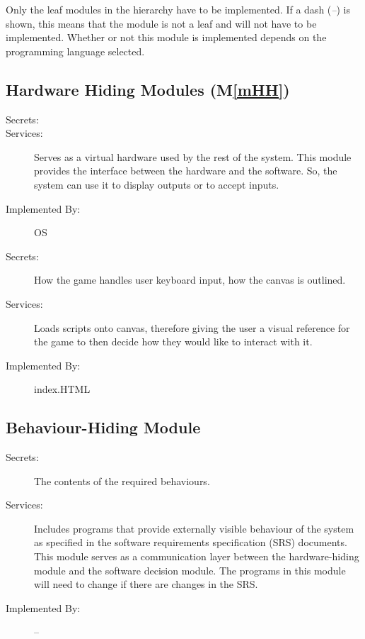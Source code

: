 \documentclass[12pt, titlepage]{article}
\newcommand{\mref}[1]{M\ref{#1}}
\begin{document}
Only the leaf modules in the
hierarchy have to be implemented. If a dash (\emph{--}) is shown, this means
that the module is not a leaf and will not have to be implemented. Whether or
not this module is implemented depends on the programming language
selected.

\subsection{Hardware Hiding Modules (\mref{mHH})}

\begin{description}
\item[Secrets:]%
\item[Services:] Serves as a virtual hardware used by the rest of the
  system. This module provides the interface between the hardware and the
  software. So, the system can use it to display outputs or to accept inputs.
\item[Implemented By:] OS
\end{description}

\begin{description}
\item[Secrets:]How the game handles user keyboard input, how the canvas is outlined.
\item[Services:] Loads scripts onto canvas, therefore giving the user a visual reference for the game to then decide how they would like to interact with it.
\item[Implemented By:] index.HTML
\end{description}

\subsection{Behaviour-Hiding Module}

\begin{description}
\item[Secrets:]The contents of the required behaviours.
\item[Services:]Includes programs that provide externally visible behaviour of
  the system as specified in the software requirements specification (SRS)
  documents. This module serves as a communication layer between the
  hardware-hiding module and the software decision module. The programs in this
  module will need to change if there are changes in the SRS.
\item[Implemented By:] --
\end{description}
\end{document}
